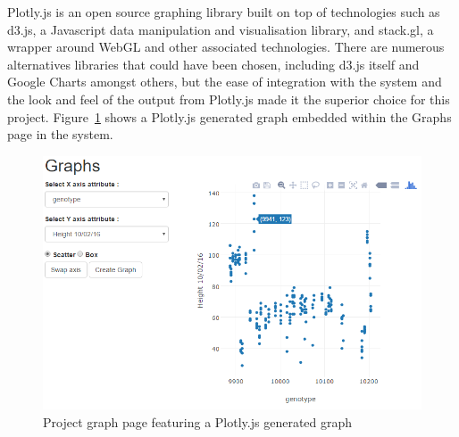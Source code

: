 Plotly.js\cite{_plotly} is an open source graphing library built on top of technologies such as d3.js, a Javascript data manipulation and visualisation library, and stack.gl, a wrapper around WebGL and other associated technologies. There are numerous alternatives libraries that could have been chosen, including d3.js itself and Google Charts amongst others, but the ease of integration with the system and the look and feel of the output from Plotly.js made it the superior choice for this project. Figure~\ref{fig:plotly} shows a Plotly.js generated graph embedded within the Graphs page in the system.


\begin{figure}[H]
    \centering
    \includegraphics[width=\textwidth]{images/design/plotly}
    \caption{Project graph page featuring a Plotly.js generated graph}
    \label{fig:plotly}
\end{figure} 
